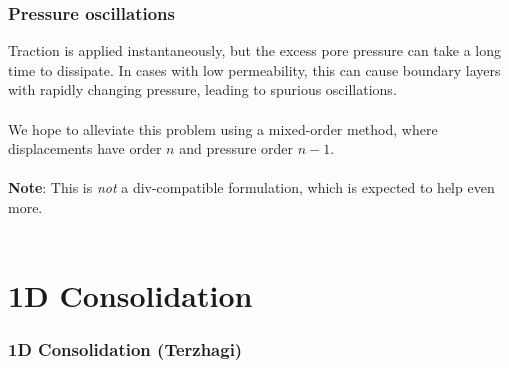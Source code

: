 \documentclass{beamer}
\begin{document}
\begin{frame}
  \frametitle{Pressure oscillations}

  Traction is applied instantaneously, but the excess pore pressure can take a
  long time to dissipate. In cases with low permeability, this can cause boundary
  layers with rapidly changing pressure, leading to spurious oscillations. \\~\\

  We hope to alleviate this problem using a mixed-order method, where
  displacements have order $n$ and pressure order $n-1$. \\~\\

  \textbf{Note}: This is \emph{not} a div-compatible formulation, which is
  expected to help even more. \\~\\
\end{frame}

\section{1D Consolidation}

\begin{frame}
  \frametitle{1D Consolidation (Terzhagi)}

  \begin{center}
  \end{center}
\end{frame}
\end{document}
